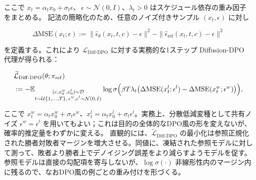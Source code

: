 ここで $x_t=\alpha_t x_0+\sigma_t\epsilon$、$\,\epsilon\sim\mathcal{N}(0,I)$、$\lambda_t>0$ はスケジュール依存の重み因子をまとめる。
記法の簡略化のため、任意のノイズ付きサンプル $(x_t,\epsilon)$ に対し

\[
\Delta\mathrm{MSE}(x_t;\epsilon):=\|\hat{\epsilon}_\theta(x_t,t,c)-\epsilon\|^2-\|\hat{\epsilon}_{\mathrm{ref}}(x_t,t,c)-\epsilon\|^2
\]


を定義する。これにより $\mathcal{L}_{\mathrm{Diff\text{-}DPO}}$ に対する実務的な1ステップ Diffusion-DPO 代理が得られる：

\begin{align*}
\begin{aligned}
&\widetilde{\mathcal{L}}_{\mathrm{Diff\text{-}DPO}}(\theta;\pi_{\mathrm{ref}}) \\
&:=-\mathbb{E}_{\substack{(c,x_0^w,x_0^l)\sim\mathcal{D}\\t\sim\mathcal{U}\{1,\ldots,T\},\,\epsilon^w,\epsilon^l\sim\mathcal{N}(0,I)}}
\log\sigma\Bigl(\beta T\lambda_t\bigl(\Delta\mathrm{MSE}(x_t^l;\epsilon^l)-\Delta\mathrm{MSE}(x_t^w;\epsilon^w)\bigr)\Bigr),
\end{aligned}
\end{align*}


ここで $x_t^w=\alpha_t x_0^w+\sigma_t\epsilon^w$、$x_t^l=\alpha_t x_0^l+\sigma_t\epsilon^l$。実務上、分散低減変種として共有ノイズ $\epsilon^w=\epsilon^l$ を用いてもよい；これは目的の全体的なDPO風の形を変えないが、確率的推定量をわずかに変える。
直観的には、$\widetilde{\mathcal{L}}_{\mathrm{Diff\text{-}DPO}}$ の最小化は参照正規化された勝者対敗者マージンを増大させる。同値に、凍結された参照モデルに対して測って、敗者より勝者上でデノイジング誤差をより減らすようモデルを促す。参照モデルは直接の勾配項を寄与しないが、$\log\sigma(\cdot)$ 非線形性内のマージン内に残るので、なおDPO風の例ごとの重み付けを形づくる。


